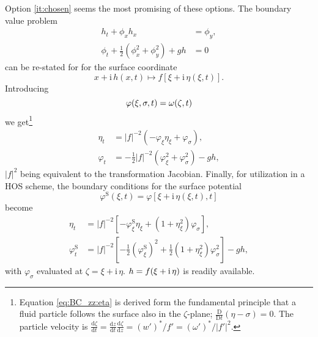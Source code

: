 \documentclass[a4paper,12pt]{article}
\newcommand{\mr}{\mathrm}
\renewcommand{\S}{^\mr{S}}
\newcommand{\ii}{\mr{i}\,}
\renewcommand{\_}[1]{_\mr{#1}}
\let\Re\relax
\let\Im\relax
\DeclareMathOperator\Re{Re}
\DeclareMathOperator\Im{Im}
\newcommand{\w}{w}
\newcommand{\rbr}[1]{\left(#1\right)}
\newcommand{\sbr}[1]{\left[#1\right]}
\newcommand{\z}{z}
\newcommand{\x}{x}
\newcommand{\zz}{\zeta}
\newcommand{\xx}{\xi}
\newcommand{\yy}{\sigma}
\newcommand{\zmap}{f}
\newcommand{\ww}{\omega}
\renewcommand{\w}{w}
\newcommand{\dd}[2]{\frac{\mr d #1}{\mr d #2}}
\begin{document}
Option \ref{it:chosen} seems the most promising of these options.
The boundary value problem 
\begin{align*}
h_t + \phi_x h_x&=\phi_y,\\
\phi_t + \frac12\rbr{\phi_x^2+\phi_y^2}+gh&=0
\end{align*}
can be re-stated for for the surface coordinate
\[
\x+\ii h(\x,t) \mapsto f[\xx+\ii \eta(\xx,t)].
\]
Introducing
\[\varphi(\xx,\yy,t)=\Re\ww(\zz,t) \]
we get\footnote{
Equation \eqref{eq:BC_zz:eta} is derived form the fundamental principle that a fluid particle follows the surface also in the $\zz$-plane; $\frac{\mr D}{\mr D t}(\eta-\yy)=0$. The particle velocity is 
$\dd\zz t = \dd\z t \dd\zz\z =(\w')^*/f'=(\ww')^*\big/|f'|^2$.
}
\begin{subequations}
\begin{align}
\eta_t &= |\zmap|^{-2}  \rbr{ -  \varphi_\xx\eta_\xx  +  \varphi_\yy}, \label{eq:BC_zz:eta} \\
\varphi_t &=   - \frac12 |\zmap|^{-2} \rbr{\varphi_\xx^2+\varphi_\yy^2}  - g h,
\end{align}%
\label{eq:BC_zz}%
\end{subequations}%
$|\zmap|^{2}$ being equivalent to the transformation Jacobian. 
Finally, for utilization in a HOS scheme, the boundary conditions for the surface potential 
\[
\varphi\S(\xx,t)=\varphi[\xx+\ii\eta(\xx,t),t]
\]
become
\begin{subequations}
\begin{align}
\eta_t &= |\zmap|^{-2} \sbr{-   \varphi\S_\xx\eta_\xx + (1+\eta_\xx^2) \varphi_\yy},\\
\varphi\S_t  &= |\zmap|^{-2}\sbr{ - \frac12  \rbr{\varphi\S_\xx}^2 + \frac12 (1+\eta_\xx^2) \varphi_\yy^2 }  - g h,
\end{align}%
\end{subequations}%
with  $\varphi_\yy$ evaluated at $\zz=\xx+\ii\eta$.
$h=\Im \zmap(\xx+\ii\eta)$ is readily available. 

\end{document}
